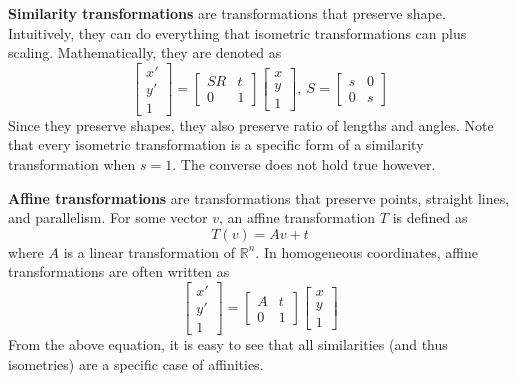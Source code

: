 \documentclass[a4paper, 12pt]{article}
\renewcommand\emph{\textbf}
\begin{document}
\emph{Similarity transformations} are transformations that preserve shape. Intuitively, they can do everything that isometric transformations can plus scaling. Mathematically, they are denoted as 
\begin{equation*}
    \begin{bmatrix}x'\\y'\\1\end{bmatrix} = \begin{bmatrix}SR & t\\ 0 & 1\end{bmatrix}\begin{bmatrix}x\\y\\1\end{bmatrix},\ S = \begin{bmatrix}s & 0\\ 0 & s\end{bmatrix}
\end{equation*}
Since they preserve shapes, they also preserve ratio of lengths and angles. Note that every isometric transformation is a specific form of a similarity transformation when $s=1$. The converse does not hold true however.

\emph{Affine transformations} are transformations that preserve points, straight lines, and parallelism. For some vector $v$, an affine transformation $T$ is defined as 
\begin{equation*}
    T(v) = Av + t
\end{equation*}
where $A$ is a linear transformation of $\mathbb{R}^n$. In homogeneous coordinates, affine transformations are often written as
\begin{equation*}
    \begin{bmatrix}x'\\y'\\1\end{bmatrix} = \begin{bmatrix}A & t\\ 0 & 1\end{bmatrix}\begin{bmatrix}x\\y\\1\end{bmatrix}
\end{equation*}
From the above equation, it is easy to see that all similarities (and thus isometries) are a specific case of affinities.
\end{document}
